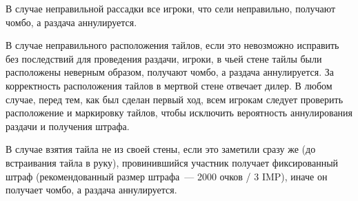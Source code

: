 \vspace{0.3cm}

В случае неправильной рассадки все игроки, что сели неправильно, получают чомбо, а раздача аннулируется.

\vspace{0.3cm}

В случае неправильного расположения тайлов, если это невозможно исправить без последствий для проведения раздачи, игроки, в чьей стене тайлы были расположены неверным образом, получают чомбо, а раздача аннулируется. За корректность расположения тайлов в мертвой стене отвечает дилер. В любом случае, перед тем, как был сделан первый ход, всем игрокам следует проверить расположение и маркировку тайлов, чтобы исключить вероятность аннулирования раздачи и получения штрафа.

\vspace{0.3cm}

В случае взятия тайла не из своей стены, если это заметили сразу же (до встраивания тайла в руку), провинившийся участник получает фиксированный штраф (рекомендованный размер штрафа~--- 2000 очков / 3 IMP), иначе он получает чомбо, а раздача аннулируется.
